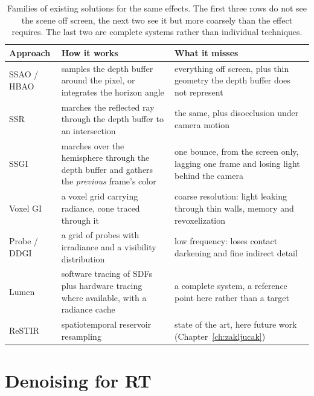 \begin{table}[tbp]
\caption[Existing approaches and their limits]{Families of existing solutions for the same effects.
The first three rows do not see the scene off screen, the next two see it but more coarsely than the
effect requires. The last two are complete systems rather than individual techniques.}
\label{tab:postojeca}
\centering
\small
\begin{tabularx}{\textwidth}{@{}l>{\raggedright\arraybackslash}X>{\raggedright\arraybackslash}X@{}}
\toprule
Approach & How it works & What it misses \\
\midrule
SSAO / HBAO \cite{mittring2007cryengine, bavoil2008hbao}
  & samples the depth buffer around the pixel, or integrates the horizon angle
  & everything off screen, plus thin geometry the depth buffer does not represent \\
\addlinespace[2pt]
SSR
  & marches the reflected ray through the depth buffer to an intersection
  & the same, plus disocclusion under camera motion \\
\addlinespace[2pt]
SSGI
  & marches over the hemisphere through the depth buffer and gathers the \emph{previous} frame's color
  & one bounce, from the screen only, lagging one frame and losing light behind the camera \\
\addlinespace[2pt]
Voxel GI \cite{crassin2011vxgi}
  & a voxel grid carrying radiance, cone traced through it
  & coarse resolution: light leaking through thin walls, memory and revoxelization \\
\addlinespace[2pt]
Probe / DDGI \cite{majercik2019ddgi, nvidia_rtxgi}
  & a grid of probes with irradiance and a visibility distribution
  & low frequency: loses contact darkening and fine indirect detail \\
\addlinespace[2pt]
Lumen \cite{epic_lumen}
  & software tracing of SDFs plus hardware tracing where available, with a radiance cache
  & a complete system, a reference point here rather than a target \\
\addlinespace[2pt]
ReSTIR \cite{bitterli2020restir, ouyang2021restirgi}
  & spatiotemporal reservoir resampling
  & state of the art, here future work (Chapter~\ref{ch:zakljucak}) \\
\bottomrule
\end{tabularx}
\end{table}

\section{Denoising for RT}
\label{sec:denoise-pregled}

